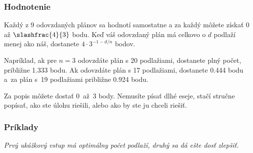 \subsubsection{Hodnotenie}

Každý z 9 odovzdaných plánov sa hodnotí samostatne a za každý môžete
získať $0$ až $\slashfrac{4}{3}$ bodu. Keď váš odovzdaný plán má celkovo o
$d$ podlaží menej ako náš, dostanete ${4}\cdot{3^{-1-d/n}}$ bodov.

Napríklad, ak pre $n=3$ odovzdáte plán s 20 podlažiami, dostanete plný
počet, približne 1.333 bodu. Ak odovzdáte plán s 17 podlažiami,
dostanete 0.444 bodu a~za plán s~19 podlažiami približne 0.924
bodu.

Za popis môžete dostať 0~až~3 body. Nemusíte písať dlhé eseje, stačí
stručne popísať, ako ste úlohu riešili, alebo ako by ste ju chceli
riešiť.

\subsubsection{Príklady}



\emph{Prvý ukážkový vstup má optimálny počet podlaží, druhý sa dá ešte dosť zlepšiť.}

